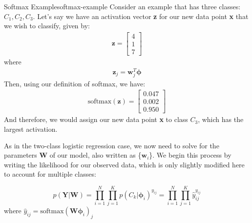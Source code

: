 \begin{example}{Softmax Example}{softmax-example}
	Consider an example that has three classes: $C_{1}, C_{2}, C_{3}$. Let's say we have an activation vector \textbf{z} for our new data point \textbf{x} that we wish to classify, given by:
	\begin{align*}
		\textbf{z} =
			\begin{bmatrix}
		    	4 \\
		        1 \\
		        7
		    \end{bmatrix}
	\end{align*}
	where
	\begin{align*}
		\textbf{z}_{j} = \textbf{w}_{j}^{T}\boldsymbol{\phi}
	\end{align*}
	Then, using our definition of softmax, we have:
	\begin{align*}
		\text{softmax}(\textbf{z}) =
			\begin{bmatrix}
				0.047 \\
				0.002 \\
				0.950
		    \end{bmatrix}
	\end{align*}
	And therefore, we would assign our new data point \textbf{x} to class $C_{3}$, which has the largest activation.
\end{example}

As in the two-class logistic regression case, we now need to solve for the parameters \textbf{W} of our model, also written as \{$\textbf{w}_{i}$\}. We begin this process by writing the likelihood for our observed data, which is only slightly modified here to account for multiple classes:

\begin{equation} \label{multi-class-log-reg-likelihood}
	p(\textbf{Y}|\textbf{W}) = \prod_{i=1}^{N}\prod_{j=1}^{K} p(C_{k}|\boldsymbol{\phi}_{i})^{y_{ij}} = \prod_{i=1}^{N}\prod_{j=1}^{K} \hat{y}_{ij}^{y_{ij}}
\end{equation}
where $\hat{y}_{ij} = \text{softmax}(\textbf{W}\boldsymbol{\phi}_{i})_{j}$

